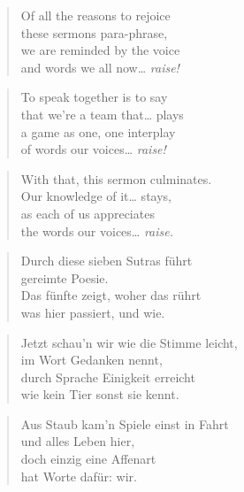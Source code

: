 \documentclass[10pt,a4paper]{article}
\begin{document}
\begin{paracol}{2}
\begin{verse}
Of all the reasons to rejoice\\
these sermons para-phrase,\\
we are reminded by the voice\\
and words we all now… \emph{raise!}
\end{verse}

\begin{verse}
To speak together is to say\\
that we’re a team that… plays\\
a game as one, one interplay\\
of words our voices… \emph{raise!}
\end{verse}

\begin{verse}
With that, this sermon culminates.\\
Our knowledge of it… stays,\\
as each of us appreciates\\
the words our voices… \emph{raise.}
\end{verse}

\switchcolumn



\begin{verse}
Durch diese sieben Sutras führt \\
gereimte Poesie. \\
Das fünfte zeigt, woher das rührt \\
was hier passiert, und wie. \\
\end{verse}

\begin{verse}
Jetzt schau’n wir wie die Stimme leicht, \\
im Wort Gedanken nennt, \\
durch Sprache Einigkeit erreicht \\
wie kein Tier sonst sie kennt. \\
\end{verse}

\begin{verse}
Aus Staub kam’n Spiele einst in Fahrt \\
und alles Leben hier, \\
doch einzig eine Affenart \\
hat Worte dafür: wir. \\
\end{verse}


\end{paracol}
\end{document}

